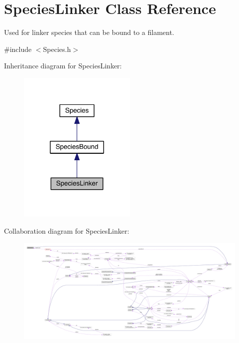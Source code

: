 \hypertarget{classSpeciesLinker}{\section{Species\+Linker Class Reference}
\label{classSpeciesLinker}
}


Used for linker species that can be bound to a filament.  




{\ttfamily \#include $<$Species.\+h$>$}



Inheritance diagram for Species\+Linker\+:\nopagebreak
\begin{figure}[H]
\begin{center}
\leavevmode
\includegraphics[width=160pt]{classSpeciesLinker__inherit__graph}
\end{center}
\end{figure}


Collaboration diagram for Species\+Linker\+:
\nopagebreak
\begin{figure}[H]
\begin{center}
\leavevmode
\includegraphics[width=350pt]{classSpeciesLinker__coll__graph}
\end{center}
\end{figure}
